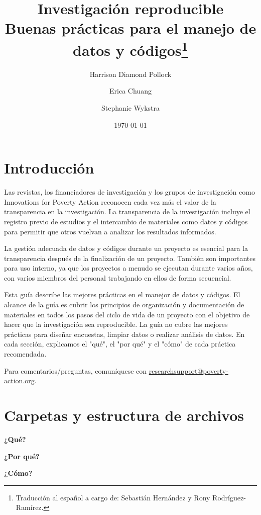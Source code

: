 \documentclass[11pt,en]{elegantpaper}
\title{Investigación reproducible \\ Buenas prácticas para el manejo de datos y códigos\footnote{Traducción al español a cargo de: Sebastián Hernández y Rony Rodríguez-Ramírez.}}
\author{Harrison Diamond Pollock \and Erica Chuang \and Stephanie Wykstra}
\date{\today}
\begin{document}
\maketitle
\tableofcontents
\newpage 
\section{Introducción}
Las revistas, los financiadores de investigación y los grupos de investigación como Innovations for Poverty Action reconocen cada vez más el valor de la transparencia en la investigación. La transparencia de la investigación incluye el registro previo de estudios y el intercambio de materiales como datos y códigos para permitir que otros vuelvan a analizar los resultados informados.

La gestión adecuada de datos y códigos durante un proyecto es esencial para la transparencia después de la finalización de un proyecto. También son importantes para uso interno, ya que los proyectos a menudo se ejecutan durante varios años, con varios miembros del personal trabajando en ellos de forma secuencial.

Esta guía describe las mejores prácticas en el manejor de datos y códigos. El alcance de la guía es cubrir los principios de organización y documentación de materiales en todos los pasos del ciclo de vida de un proyecto con el objetivo de hacer que la investigación sea reproducible. La guía no cubre las mejores prácticas para diseñar encuestas, limpiar datos o realizar análisis de datos. En cada sección, explicamos el "qué", el "por qué" y el "cómo" de cada práctica recomendada.

Para comentarios/preguntas, comuníquese con \href{mailto:researchsupport@poverty-action.org}{researchsupport@poverty-action.org}.
\section{Carpetas y estructura de archivos}
\textbf{¿Qué?}


\textbf{¿Por qué?} 


\textbf{¿Cómo? }
\end{document}
